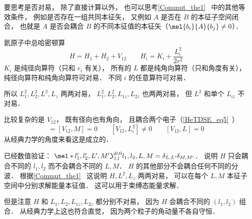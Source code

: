 
要思考是否对易， 除了直接计算以外， 也可以思考\autoref{Commut_the1}~ 中的其他等效条件， 例如是否存在一组共同本征矢， 又例如 $A$ 是否在 $B$ 的本征子空间闭合， 也就是 $A$ 是否会耦合 $B$ 的不同本征值的本征矢（$\mel{b_i}{A}{b_j} \ne 0$）．

氦原子中总哈密顿算
\begin{equation}
H = H_1 + H_2 + V_{12} \qquad H_i = K_i + \frac{L_i^2}{2r^2}
\end{equation}
$K_i$ 是纯径向算符（只和 $r_i$ 有关）， 所有的 $L$ 都是纯角向算符（只和角度有关）， 纯径向算符和纯角向算符可对易． 不同 $i$ 的任意算符可对易．

所以 $L_1^2, L_2^2, L^2, L_z$ 两两对易， $L_1^2, L_2^2, L_{1z}, L_{2z}$ 也两两对易， 但 $L^2$ 和单个 $L_{iz}$ 不对易．

比较复杂的是 $V_{12}$， 既有径向也有角向， 且耦合两个电子（\autoref{HeTDSE_eq5}~）
\begin{equation}
[V_{12}, L^2] = [V_{12}, M] = 0
\qquad
[V_{12}, L_i^2] \ne 0
\qquad
[V_{12}, L_{}] = 0
\end{equation}
从经典力学的角度来看这是成立的．

已经数值验证： $\mel*{l'_1,l'_2,L',M'}{\mathcal Y_{l,l}^{0,0}}{l_1,l_2,L,M} = \delta_{L,L'}\delta_{M,M'}$． 说明 $H$ 只会耦合不同的 $l_1,l_2$ 而不会耦合不同的 $L,M$． $H$ 的其他部分不会耦合任何不同的分波． 根据\autoref{Commut_the1}~ 这说明 $H,L^2,L_z$ 两两对易， 可以在每个 $L,M$ 本征子空间中分别求解能量本征值． 这可以用于束缚态能量求解．

但是注意 $H$ 和 $L_1, L_2, L_{1z}, L_{2z}$ 都分别不对易， 因为 $H$ 会耦合不同的 $(l_1,l_2)$ 组合． 从经典力学上这也符合直觉， 因为两个粒子的角动量不各自守恒．



